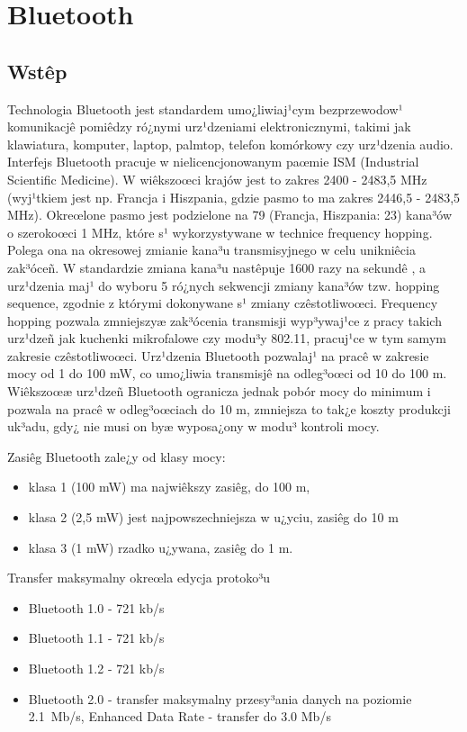\chapter{Bluetooth}
\label{sec:Bluetooth}
%
\section{Wstêp}
\label{sec:Wstep}
%
 Technologia Bluetooth jest standardem umo¿liwiaj¹cym bezprzewodow¹ komunikacjê
pomiêdzy ró¿nymi urz¹dzeniami elektronicznymi, takimi jak
klawiatura, komputer, laptop, palmtop, telefon komórkowy czy
urz¹dzenia audio. Interfejs Bluetooth pracuje w nielicencjonowanym
paœmie ISM (Industrial Scientific Medicine). W wiêkszoœci krajów
jest to zakres 2400 - 2483,5 MHz (wyj¹tkiem jest np. Francja i
Hiszpania, gdzie pasmo to ma zakres 2446,5 - 2483,5 MHz). Okreœlone
pasmo jest podzielone na 79 (Francja, Hiszpania: 23) kana³ów o
szerokoœci 1 MHz, które s¹ wykorzystywane w technice frequency
hopping. Polega ona na okresowej zmianie kana³u transmisyjnego w
celu unikniêcia zak³óceñ. W standardzie zmiana kana³u nastêpuje 1600
razy na sekundê , a urz¹dzenia maj¹ do wyboru 5 ró¿nych sekwencji
zmiany kana³ów tzw. hopping sequence, zgodnie z którymi dokonywane
s¹ zmiany czêstotliwoœci. Frequency hopping pozwala zmniejszyæ
zak³ócenia transmisji wyp³ywaj¹ce z pracy takich urz¹dzeñ jak
kuchenki mikrofalowe czy modu³y 802.11, pracuj¹ce w tym samym
zakresie czêstotliwoœci. Urz¹dzenia Bluetooth pozwalaj¹ na pracê w
zakresie mocy od 1 do 100 mW, co umo¿liwia transmisjê na odleg³oœci
od 10 do 100 m. Wiêkszoœæ urz¹dzeñ Bluetooth ogranicza jednak pobór
mocy do minimum i pozwala na pracê w odleg³oœciach do 10 m,
zmniejsza to tak¿e koszty produkcji uk³adu, gdy¿ nie musi on byæ
wyposa¿ony w modu³ kontroli mocy.

Zasiêg Bluetooth zale¿y od klasy mocy:

\begin{itemize}
    \item klasa 1 (100 mW) ma najwiêkszy zasiêg, do 100 m,
    \item klasa 2 (2,5 mW) jest najpowszechniejsza w u¿yciu, zasiêg do 10 m
    \item klasa 3 (1 mW) rzadko u¿ywana, zasiêg do 1 m.
\end{itemize}

 Transfer maksymalny okreœla edycja protoko³u
\begin{itemize}
    \item Bluetooth 1.0 - 721 kb/s
    \item Bluetooth 1.1 - 721 kb/s
    \item Bluetooth 1.2 - 721 kb/s
    \item Bluetooth 2.0 - transfer maksymalny przesy³ania danych na poziomie 2.1~Mb/s, Enhanced Data Rate - transfer do 3.0 Mb/s
\end{itemize}

